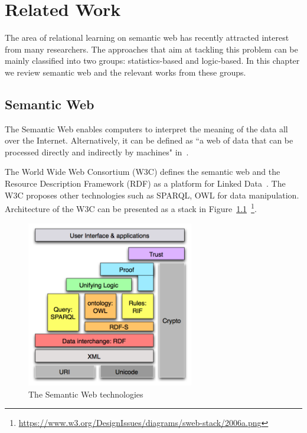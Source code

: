 \chapter{Related Work}
\label{chap:relwork}

The area of relational learning on semantic web has recently attracted interest from many researchers. The approaches that aim at tackling this problem can be mainly classified into two groups: statistics-based and logic-based. In this chapter we review semantic web and the relevant works from these groups.

\section{Semantic Web}

The Semantic Web enables computers to interpret the meaning of the data all over the Internet. Alternatively, it can be defined as ``a web of data that can be processed directly and indirectly by machines" in~\cite{ref26}.

The World Wide Web Consortium (W3C) defines the semantic web and the Resource Description Framework (RDF) as a platform for Linked Data~\cite{ref26}. The W3C proposes other technologies such as SPARQL, OWL for data manipulation. Architecture of the W3C can be presented as a stack in Figure~\ref{fig1}~\footnote{\url{https://www.w3.org/DesignIssues/diagrams/sweb-stack/2006a.png}}.

\begin{figure}
\centering
\includegraphics[width=0.65\textwidth]{figures/semantic_web.png}
\caption{The Semantic Web technologies}
\label{fig1}
\end{figure}

